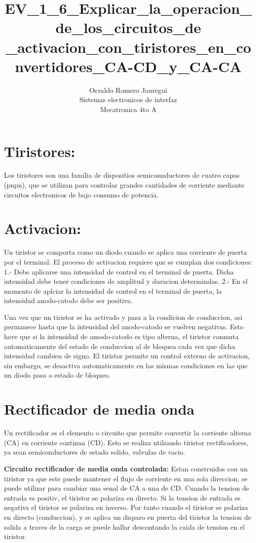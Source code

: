 \documentclass[11pt]{article}
\title{\textbf{EV\_1\_6\_Explicar\_la\_operacion\_de\_los\_circuitos\_de
\_activacion\_con\_tiristores\_en\_convertidores\_CA-CD\_y\_CA-CA}}
\author{Osvaldo Romero Jauregui\\
		Sistemas electronicos de interfaz\\
		Mecatronica 4to A}
\date{}
\begin{document}
\maketitle

\section{Tiristores:}
Los tiristores son una familia de dispositios semiconnductores de cuatro capas (pnpn), que se utilizan para controlar grandes cantidades de corriente mediante circuitos electronicos de bajo consumo de potencia.

\section{Activacion:}
Un tiristor se comporta como un diodo cuando se aplica una corriente de puerta por el terminal. El proceso de activacion requiere que se cumplan dos condiciones: 1.- Debe aplicarse una intensidad de control en el terminal de puerta. Dicha intensidad debe tener condiciones de amplitud y duracion determindas. 2.- En el momento de aplciar la intensidad de control en el terminal de puerta, la intensidad anodo-catodo debe ser positiva.

Una vez que un tiristor se ha activado y pasa a la condicion de conduccion, asi permanece hasta que la intensidad del anodo-catodo se vuelven negativas. Esto have que si la intensidad de amodo-catodo es tipo alterna, el tiristor conmuta automaticamente del estado de conduccion al de bloquea cada vez que dicha intensidad cambien de signo.
El tiristor permite un control externo de activacion, sin embargo, se desactiva automaticamente en las mismas condiciones en las que un diodo pasa a estado de bloqueo.


\section{Rectificador de media onda}
Un rectificador es el elemento o circuito que permite convertir la corriente alterna (CA) en corriente continua (CD). Esto se realiza utilzando tiristor rectificadores, ya sean semiconductores de estado solido, valvulas de vacio.

\textbf{Circuito rectificador de media onda controlada:}             		
Estan construidos con un tiristor ya que este puede mantener el flujo de corriente en una sola direccion, se puede utilizar para cambiar una senal de CA a una de CD. Cuando la tension de entrada es positiv, el tiristor se polariza en directo. Si la tension de entrada es negativa el tiristor se polariza en inverso. Por tanto cuando el tiristor se polariza en directo (conduccion), y se aplica un disparo en puerta del tiristor la tension de salida a traves de la carga se puede hallar descontando la caida de tension en el tiristor.
\end{document}
